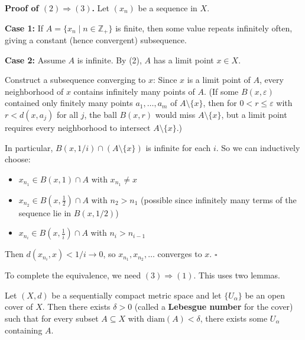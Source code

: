 \documentclass[11pt]{report}
\renewenvironment{proof}[1][Proof]{\noindent\textbf{#1.} }{\hfill$\square$\par\vspace{5pt}}
\begin{document}
\begin{proof}[Proof of $(2) \Rightarrow (3)$]
Let $(x_n)$ be a sequence in $X$.

\textbf{Case 1:} If $A = \{x_n \mid n \in \mathbb{Z}_+\}$ is finite, then some value repeats infinitely often, giving a constant (hence convergent) subsequence.

\textbf{Case 2:} Assume $A$ is infinite. By (2), $A$ has a limit point $x \in X$.

Construct a subsequence converging to $x$: Since $x$ is a limit point of $A$, every neighborhood of $x$ contains infinitely many points of $A$. (If some $B(x, \varepsilon)$ contained only finitely many points $a_1, \ldots, a_m$ of $A \setminus \{x\}$, then for $0 < r \le \varepsilon$ with $r < d(x, a_j)$ for all $j$, the ball $B(x, r)$ would miss $A \setminus \{x\}$, but a limit point requires every neighborhood to intersect $A \setminus \{x\}$.)

In particular, $B(x, 1/i) \cap (A \setminus \{x\})$ is infinite for each $i$. So we can inductively choose:
\begin{itemize}
    \item $x_{n_1} \in B(x, 1) \cap A$ with $x_{n_1} \neq x$
    \item $x_{n_2} \in B(x, \frac{1}{2}) \cap A$ with $n_2 > n_1$ (possible since infinitely many terms of the sequence lie in $B(x, 1/2)$)
    \item $x_{n_i} \in B(x, \frac{1}{i}) \cap A$ with $n_i > n_{i-1}$
\end{itemize}

Then $d(x_{n_i}, x) < 1/i \to 0$, so $x_{n_1}, x_{n_2}, \ldots$ converges to $x$.
\end{proof}

To complete the equivalence, we need $(3) \Rightarrow (1)$. This uses two lemmas.

\begin{lembox}\label{lem:lebesgue}
Let $(X, d)$ be a sequentially compact metric space and let $\{U_\alpha\}$ be an open cover of $X$. Then there exists $\delta > 0$ (called a \textbf{Lebesgue number} for the cover) such that for every subset $A \subseteq X$ with $\text{diam}(A) < \delta$, there exists some $U_\alpha$ containing $A$.
\end{lembox}
\end{document}
